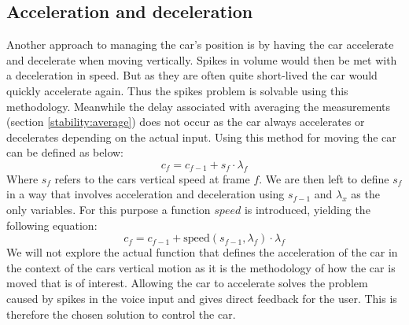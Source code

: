 \subsection{Acceleration and deceleration}\label{stability:acceleration}
Another approach to managing the car's position is by having the car accelerate and decelerate when moving vertically.
Spikes in volume would then be met with a deceleration in speed.
But as they are often quite short-lived the car would quickly accelerate again.
Thus the spikes problem is solvable using this methodology.
Meanwhile the delay associated with averaging the measurements (section \ref{stability:average}) does not occur as the car always accelerates or decelerates depending on the actual input.
Using this method for moving the car can be defined as below:
$$c_f = c_{f-1} + s_f \cdot \lambda_f$$
Where $s_f$ refers to the cars vertical speed at frame $f$.
We are then left to define $s_f$ in a way that involves acceleration and deceleration using $s_{f-1}$ and $\lambda_x$ as the only variables.
For this purpose a function $speed$ is introduced, yielding the following equation:
$$c_f = c_{f-1} + \text{speed}(s_{f-1}, \lambda_f) \cdot \lambda_f$$
We will not explore the actual function that defines the acceleration of the car in the context of the cars vertical motion as it is the methodology of how the car is moved that is of interest.
Allowing the car to accelerate solves the problem caused by spikes in the voice input and gives direct feedback for the user.
This is therefore the chosen solution to control the car.